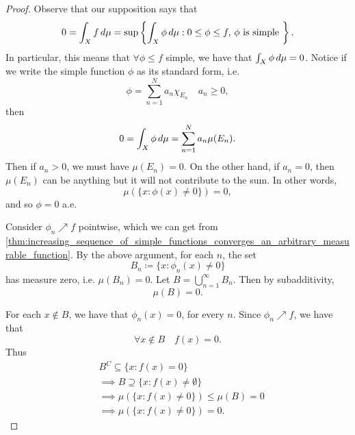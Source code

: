 \documentclass[notoc,notitlepage]{tufte-book}
\begin{document}
\begin{proof}
  \hlbnoted{$(\implies)$}
  Observe that our supposition says that
  \begin{equation*}
    0 = \int_{X} f \mathop{}\!d{\mu} = \sup \left\{ 
      \int_{X} \phi \mathop{}\!d{\mu} : 0 \leq \phi \leq f,\, \phi \text{ is simple }
    \right\}.
  \end{equation*}
  In particular, this means that $\forall \phi \leq f$ simple,
  we have that $\int_{X} \phi \mathop{}\!d{\mu} = 0$.
  Notice if we write the simple function $\phi$ as its standard form,
  i.e.
  \begin{equation*}
    \phi = \sum_{n=1}^{N} a_n \chi_{E_n} \quad a_n \geq 0,
  \end{equation*}
  then
  \begin{equation*}
    0 = \int_{X} \phi \mathop{}\!d{\mu} = \sum_{n=1}^{N} a_n \mu(E_n).
  \end{equation*}
  Then if $a_n > 0$, we must have $\mu(E_n) = 0$.
  On the other hand, if $a_n = 0$, then $\mu(E_n)$ can be anything
  but it will not contribute to the sum.
  In other words,
  \begin{equation*}
    \mu(\{ x : \phi(x) \neq 0\}) = 0,
  \end{equation*}
  and so $\phi = 0$ a.e.

  Consider $\phi_n \nearrow f$ pointwise, which we can get from
  \cref{thm:increasing_sequence_of_simple_functions_converges_an_arbitrary_measurable_function}.
  By the above argument, for each $n$, the set
  \begin{equation*}
    B_n \coloneqq \{ x : \phi_n(x) \neq 0 \}
  \end{equation*}
  has measure zero, i.e. $\mu(B_n) = 0$.
  Let $B = \bigcup_{n=1}^{\infty} B_n$.
  Then by subadditivity,
  \begin{equation*}
    \mu(B) = 0.
  \end{equation*}

  For each $x \notin B$, we have that $\phi_n(x) = 0$, for every $n$.
  Since $\phi_n \nearrow f$, we have that
  \begin{equation*}
    \forall x \notin B \quad f(x) = 0.
  \end{equation*}
  Thus
  \begin{align*}
    &B^C \subseteq \{ x : f(x) = 0 \} \\
    &\implies B \supseteq \{ x : f(x) \neq \emptyset \} \\
    &\implies \mu(\{x : f(x) \neq 0\}) \leq \mu(B) = 0 \\
    &\implies \mu(\{x : f(x) \neq 0\}) = 0.
  \end{align*}


\end{proof}
\end{document}
